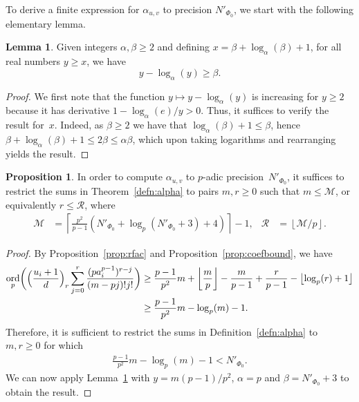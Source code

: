 \documentclass[a4paper,11pt]{article}
\numberwithin{equation}{section}
\providecommand{\floor}[1]{\left\lfloor#1\right\rfloor}   %
\providecommand{\ceil}[1]{\left\lceil#1\right\rceil}   %
\DeclareMathOperator{\ord}{ord}          %
\theoremstyle{definition}
\newtheorem{lem}[thm]{Lemma}
\newtheorem{prop}[thm]{Proposition}
\begin{document}
To derive a finite expression for $\alpha_{u,v}$ to precision $N'_{\Phi_0}$, 
we start with the following elementary lemma.

\begin{lem} \label{lem:log}
Given integers $\alpha, \beta \geq 2$ and defining 
$x = \beta + \log_{\alpha}(\beta) + 1$, for all real numbers $y \geq x$,
we have 
\begin{equation*}
y - \log_{\alpha}(y) \geq \beta.
\end{equation*}
\end{lem}

\begin{proof}
We first note that the function $y \mapsto y - \log_{\alpha}(y)$ is increasing 
for $y \geq 2$ because it has derivative $1 - \log_{\alpha}(e)/y > 0$.  Thus, 
it suffices to verify the result for~$x$.  Indeed, as $\beta \geq 2$ we have 
that $\log_{\alpha}(\beta) + 1 \leq \beta$, hence 
$\beta + \log_{\alpha}(\beta) + 1 \leq 2 \beta \leq \alpha \beta$,
which upon taking logarithms and rearranging yields the result.
\end{proof}

\begin{prop} \label{prop:MR}
In order to compute $\alpha_{u,v}$ to $p$-adic precision~$N'_{\Phi_0}$, 
it suffices to restrict the sums in Theorem~\ref{defn:alpha} to pairs $m,r \geq 0$ 
such that $m \leq \mathcal{M}$, or equivalently $r \leq \mathcal{R}$, where 
\begin{align*}
\mathcal{M} &= \ceil{\frac{p^2}{p-1}(N'_{\Phi_0}+\log_p(N'_{\Phi_0}+3)+4)} - 1,
&\mathcal{R} &= \floor{\mathcal{M}/p}.
\end{align*}
\end{prop}

\begin{proof}
By Proposition~\ref{prop:rfac} and Proposition~\ref{prop:coefbound}, we have
\begin{align*}
\ord_p \biggl( \Bigl( \frac{u_i+1}{d} \Bigr)_r \sum_{j=0}^{r} \frac{(p a_i^{p-1})^{r-j}}{(m-pj)!j!} \biggr) 
    &\geq  \frac{p-1}{p^2}m + \floor{\frac{m}{p}}-\frac{m}{p-1}+\frac{r}{p-1}-\floor{\log_p(r)+1} \\
    &\geq  \frac{p-1}{p^2}m - \log_p(m)-1.
\end{align*}
Therefore, it is sufficient to restrict the sums in Definition~\ref{defn:alpha} 
to $m,r \geq 0$ for which
\begin{align*}
\frac{p-1}{p^2}m - \log_p(m) -1 < N'_{\Phi_0}. 
\end{align*}
We can now apply Lemma~\ref{lem:log} with $y=m(p-1)/p^2$, $\alpha=p$ 
and $\beta=N'_{\Phi_0}+3$ to obtain the result.
\end{proof}
\end{document}
